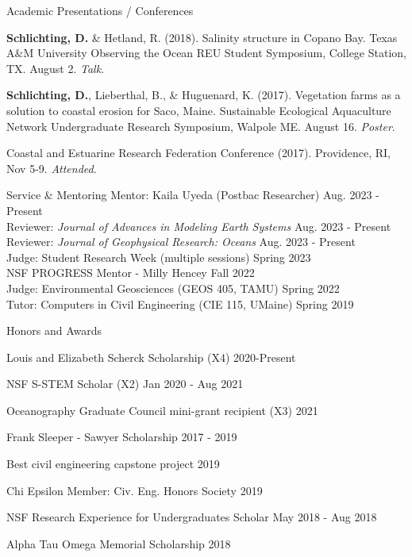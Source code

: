 \documentclass{resume} %
\begin{document}
\begin{rSection}{Academic Presentations / Conferences}
\begin{etaremune}
    \item \textbf{Schlichting, D.} \& Hetland, R. (2018). Salinity structure in Copano Bay. Texas A$\&$M University Observing the Ocean REU Student Symposium, College Station, TX. August 2. \textit{Talk}.
    \item \textbf{Schlichting, D.}, Lieberthal, B., \& Huguenard, K. (2017). Vegetation farms as a solution to coastal erosion for Saco, Maine. Sustainable Ecological Aquaculture Network Undergraduate Research Symposium, Walpole ME. August 16. \textit{Poster}.
    \item Coastal and Estuarine Research Federation Conference (2017). Providence, RI, Nov 5-9. \textit{Attended}.
\end{etaremune}
\end{rSection}

\begin{rSection}{Service \& Mentoring}
Mentor: Kaila Uyeda (Postbac Researcher) \hfill Aug. 2023 - Present \\
Reviewer: \textit{Journal of Advances in Modeling Earth Systems} \hfill Aug. 2023 - Present \\
Reviewer: \textit{Journal of Geophysical Research: Oceans} \hfill Aug. 2023 - Present \\
Judge: Student Research Week (multiple sessions) \hfill Spring 2023 \\
NSF PROGRESS Mentor - Milly Hencey \hfill Fall 2022 \\
Judge: Environmental Geosciences (GEOS 405, TAMU) \hfill Spring 2022 \\
Tutor: Computers in Civil Engineering (CIE 115, UMaine) \hfill Spring 2019 \\
\end{rSection}
\vspace{-10pt}
\begin{rSection}{Honors and Awards} \itemsep -3pt {}
\vspace{-7pt}
\item Louis and Elizabeth Scherck Scholarship (X4) \hfill 2020-Present
\item NSF S-STEM Scholar (X2) \hfill Jan 2020 - Aug 2021 
\item Oceanography Graduate Council mini-grant recipient (X3) \hfill 2021
\item Frank Sleeper - Sawyer Scholarship \hfill 2017 - 2019
\item Best civil engineering capstone project \hfill 2019
\item Chi Epsilon Member: Civ. Eng. Honors Society \hfill 2019 
\item NSF Research Experience for Undergraduates Scholar \hfill May 2018 - Aug 2018
\item Alpha Tau Omega Memorial Scholarship \hfill 2018
\end{rSection}
\end{document}
